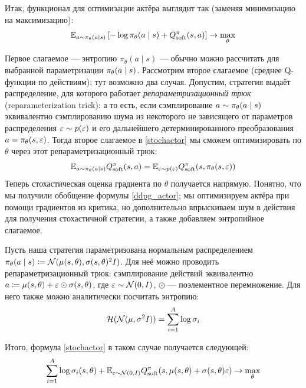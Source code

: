 Итак, функционал для оптимизации актёра выглядит так (заменяя минимизацию на максимизацию):
\begin{equation}\label{stochactor}
\mathbb{E}_{a \sim \pi_\theta(a \mid s)} \left[ -\log \pi_\theta(a \mid s) + Q^\pi_{\mathrm{soft}}(s, a) \right] \to \max_{\theta}
\end{equation}

Первое слагаемое --- энтропию $\pi_\theta(a \mid s)$ --- обычно можно рассчитать для выбранной параметризации $\pi_{\theta}(a \HM\mid s)$. Рассмотрим второе слагаемое (среднее Q-функции по действиям); тут возможно два случая. Допустим, стратегия выдаёт распределение, для которого работает \emph{репараметризационный трюк} (reparameterization trick): а то есть, если сэмплирование $a \HM\sim \pi_\theta(a \mid s)$ эквивалентно сэмплированию шума из некоторого не зависящего от параметров распределения $\varepsilon \sim p(\varepsilon)$ и его дальнейшего детерминированного преобразования $a \HM= \pi_{\theta}(s, \eps)$. Тогда второе слагаемое в \eqref{stochactor} мы сможем оптимизировать по $\theta$ через этот репараметризационный трюк:
\begin{equation*}
\mathbb{E}_{a \sim \pi_\theta(a \mid s)} Q^\pi_{\mathrm{soft}}(s, a) = \mathbb{E}_{\varepsilon \sim p(\varepsilon)} Q^\pi_{\mathrm{soft}}(s, \pi_{\theta}(s, \varepsilon))
\end{equation*}
Теперь стохастическая оценка градиента по $\theta$ получается напрямую. Понятно, что мы получили обобщение формулы \eqref{ddpg_actor}; мы оптимизируем актёра при помощи градиентов из критика, но дополнительно впрыскиваем шум в действия для получения стохастичной стратегии, а также добавляем энтропийное слагаемое. 

\begin{exampleBox}[label=ex:gaussianactor_sac]{}
Пусть наша стратегия параметризована нормальным распределением $\pi_\theta(a \mid s) \HM\coloneqq \N(\mu(s, \theta), \sigma(s, \theta)^2I)$. Для неё можно проводить репараметризационный трюк: сэмплирование действий эквивалентно $a \coloneqq \mu(s, \theta) \HM+ \eps \HM\odot \sigma(s, \theta)$, где $\eps \HM\sim \N(0, I)$, $\odot$ --- поэлементное перемножение. Для него также можно аналитически посчитать энтропию:
$$\mathcal{H}(\mathcal{N}(\mu, \sigma^2I)) = \sum_{i=1}^{A} \log \sigma_i$$

Итого, формула \eqref{stochactor} в таком случае получается следующей:
$$\sum_{i=1}^A\log \sigma_i(s, \theta) + \mathbb{E}_{\varepsilon \sim \mathcal{N}(0, I)} Q^\pi_{\mathrm{soft}}(s, \mu(s, \theta) + \sigma(s, \theta) \varepsilon) \to \max_\theta $$
\end{exampleBox}


